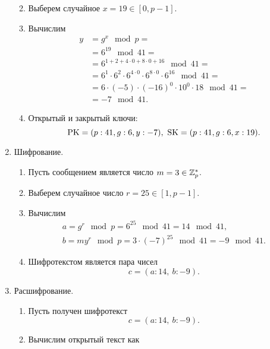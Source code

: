 \begin{enumerate}
\begin{enumerate}
\begin{table}[!ht]
{\begin{tabular}{|c|c|c|c|c|c|c|c|c|}
                    \end{tabular} }
                \end{table}
            \item Выберем случайное $x = 19 \in [0, p-1]$.
            \item Вычислим
                \[ \begin{array}{ll}
                    y & = g^x \mod p = \\
                    & = 6^{19} \mod 41 = \\
                    & = 6^{1 + 2 + 4 \cdot 0 + 8 \cdot 0 + 16} \mod 41 = \\
                    & = 6^1 \cdot 6^2 \cdot 6^{4 \cdot 0} \cdot 6^{8 \cdot 0} \cdot 6^{16} \mod 41 = \\
                    & = 6 \cdot (-5) \cdot (-16)^0 \cdot 10^0 \cdot 18 \mod 41 = \\
                    & = -7 \mod 41.
                \end{array} \]
            \item Открытый и закрытый ключи:
                \[ \textrm{PK} = (p:41, g:6, y:-7), ~ \textrm{SK} = (p:41, g:6, x:19). \]
        \end{enumerate}
    \item Шифрование.
        \begin{enumerate}
            \item Пусть сообщением является число $m = 3 \in \mathbb{Z}_p^*$.
            \item Выберем случайное число $r = 25 \in [1, p-1]$.
            \item Вычислим
                \[ \begin{array}{l}
                    a = g^r \mod p = 6^{25} \mod 41 = 14 \mod 41, \\
                    b = m y^r \mod p = 3 \cdot (-7)^{25} \mod 41 = -9 \mod 41.
                \end{array} \]
            \item Шифротекстом является пара чисел
                \[ c = (a:14, ~ b:-9). \]
        \end{enumerate}
    \item Расшифрование.
        \begin{enumerate}
            \item Пусть получен шифротекст
                \[ c = (a:14, ~ b:-9). \]
            \item Вычислим открытый текст как
                \[ \begin{array}{ll}

\end{array}\]
\end{enumerate}
\end{enumerate}
